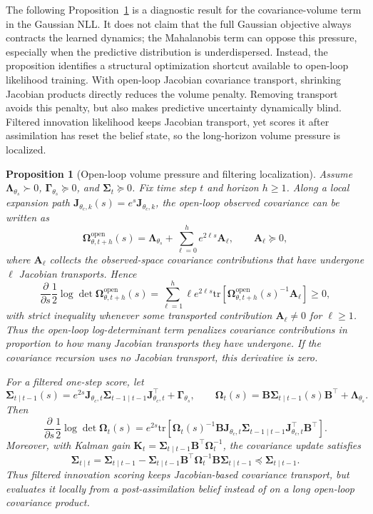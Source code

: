 \documentclass{article}
\theoremstyle{plain}
\newtheorem{proposition}{Proposition}
\theoremstyle{definition}
\theoremstyle{remark}
\newcommand{\tr}{\mathrm{tr}}
\begin{document}
The following Proposition~\ref{prop:volume_pressure_localization} is a diagnostic result for the covariance-volume term in the Gaussian NLL. It does not claim that the full Gaussian objective always contracts the learned dynamics; the Mahalanobis term can oppose this pressure, especially when the predictive distribution is underdispersed. Instead, the proposition identifies a structural optimization shortcut available to open-loop likelihood training. With open-loop Jacobian covariance transport, shrinking Jacobian products directly reduces the volume penalty. Removing transport avoids this penalty, but also makes predictive uncertainty dynamically blind. Filtered innovation likelihood keeps Jacobian transport, yet scores it after assimilation has reset the belief state, so the long-horizon volume pressure is localized.

\begin{proposition}[Open-loop volume pressure and filtering localization]
\label{prop:volume_pressure_localization}
Assume $\bm\Lambda_{\theta_s}\succ0$, $\bm\Gamma_{\theta_s}\succeq0$, and $\bm\Sigma_t\succeq0$. Fix time step $t$ and horizon $h\ge1$. Along a local
expansion path $\bm J_{\theta_c,k}(s)=e^s\bm J_{\theta_c,k}$, the open-loop
observed covariance can be written as
\[
\bm\Omega^{\mathrm{open}}_{\theta,t+h}(s)
=
\bm\Lambda_{\theta_s}
+
\sum_{\ell=0}^{h} e^{2\ell s}\bm A_\ell,
\qquad
\bm A_\ell\succeq0,
\]
where $\bm A_\ell$ collects the observed-space covariance contributions that
have undergone $\ell$ Jacobian transports. Hence
\[
\frac{\partial}{\partial s}
\frac12\log\det\bm\Omega^{\mathrm{open}}_{\theta,t+h}(s)
=
\sum_{\ell=1}^{h}
\ell e^{2\ell s}
\tr \left[
\bm\Omega^{\mathrm{open}}_{\theta,t+h}(s)^{-1}
\bm A_\ell
\right]
\ge 0,
\]
with strict inequality whenever some transported contribution
$\bm A_\ell\neq0$ for $\ell\ge1$. Thus the open-loop log-determinant term
penalizes covariance contributions in proportion to how many Jacobian transports
they have undergone. If the covariance recursion uses no Jacobian transport,
this derivative is zero.

For a filtered one-step score, let
\[
\bm\Sigma_{t\mid t-1}(s)
=
e^{2s}
\bm J_{\theta_c,t}\bm\Sigma_{t-1\mid t-1}\bm J_{\theta_c,t}^{\top}
+
\bm\Gamma_{\theta_s},
\qquad
\bm\Omega_t(s)=
\bm B\bm\Sigma_{t\mid t-1}(s)\bm B^\top+\bm\Lambda_{\theta_s}.
\]
Then
\[
\frac{\partial}{\partial s}
\frac12\log\det\bm\Omega_t(s)
=
e^{2s}
\tr \left[
\bm\Omega_t(s)^{-1}
\bm B\bm J_{\theta_c,t}\bm\Sigma_{t-1\mid t-1}
\bm J_{\theta_c,t}^{\top}\bm B^\top
\right].
\]
Moreover, with Kalman gain
$\bm K_t=\bm\Sigma_{t\mid t-1}\bm B^\top\bm\Omega_t^{-1}$, the covariance update satisfies
\[
\bm\Sigma_{t\mid t}
=
\bm\Sigma_{t\mid t-1}
-
\bm\Sigma_{t\mid t-1}\bm B^\top
\bm\Omega_t^{-1}
 \bm B\bm\Sigma_{t\mid t-1}
\preceq
\bm\Sigma_{t\mid t-1}.
\]
Thus filtered innovation scoring keeps Jacobian-based covariance transport, but
evaluates it locally from a post-assimilation belief instead of on a long
open-loop covariance product.
\end{proposition}
\end{document}
